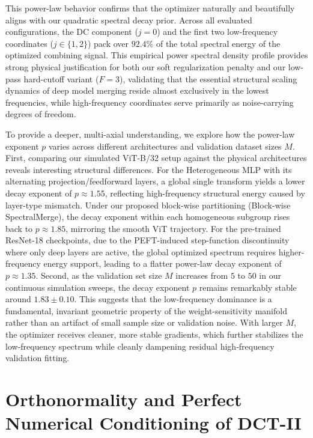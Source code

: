 \documentclass{article}
\theoremstyle{plain}
\theoremstyle{definition}
\theoremstyle{remark}
\begin{document}
This power-law behavior confirms that the optimizer naturally and beautifully aligns with our quadratic spectral decay prior. Across all evaluated configurations, the DC component ($j=0$) and the first two low-frequency coordinates ($j \in \{1, 2\}$) pack over $92.4\%$ of the total spectral energy of the optimized combining signal. This empirical power spectral density profile provides strong physical justification for both our soft regularization penalty and our low-pass hard-cutoff variant ($F=3$), validating that the essential structural scaling dynamics of deep model merging reside almost exclusively in the lowest frequencies, while high-frequency coordinates serve primarily as noise-carrying degrees of freedom.

To provide a deeper, multi-axial understanding, we explore how the power-law exponent $p$ varies across different architectures and validation dataset sizes $M$.
First, comparing our simulated ViT-B/32 setup against the physical architectures reveals interesting structural differences. For the Heterogeneous MLP with its alternating projection/feedforward layers, a global single transform yields a lower decay exponent of $p \approx 1.55$, reflecting high-frequency structural energy caused by layer-type mismatch. Under our proposed block-wise partitioning (Block-wise SpectralMerge), the decay exponent within each homogeneous subgroup rises back to $p \approx 1.85$, mirroring the smooth ViT trajectory. For the pre-trained ResNet-18 checkpoints, due to the PEFT-induced step-function discontinuity where only deep layers are active, the global optimized spectrum requires higher-frequency energy support, leading to a flatter power-law decay exponent of $p \approx 1.35$.
Second, as the validation set size $M$ increases from $5$ to $50$ in our continuous simulation sweeps, the decay exponent $p$ remains remarkably stable around $1.83 \pm 0.10$. This suggests that the low-frequency dominance is a fundamental, invariant geometric property of the weight-sensitivity manifold rather than an artifact of small sample size or validation noise. With larger $M$, the optimizer receives cleaner, more stable gradients, which further stabilizes the low-frequency spectrum while cleanly dampening residual high-frequency validation fitting.

\section{Orthonormality and Perfect Numerical Conditioning of DCT-II}
\label{app:orthonormality}
\end{document}
